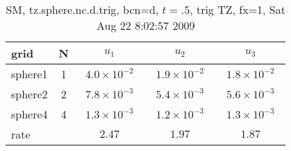 \begin{table}[hbt]\tableFont %
\begin{center}
\begin{tabular}{|l|c|c|c|c|} \hline 
grid  & N &  $u_1$ & $u_2$ & $u_3$  \\ \hline 
             sphere1 &     1 & ~$4.0\times10^{ -2}$~ & ~$1.9\times10^{ -2}$~ & ~$1.8\times10^{ -2}$~  \\ \hline
             sphere2 &     2 & ~$7.8\times10^{ -3}$~ & ~$5.4\times10^{ -3}$~ & ~$5.6\times10^{ -3}$~  \\ \hline
             sphere4 &     4 & ~$1.3\times10^{ -3}$~ & ~$1.2\times10^{ -3}$~ & ~$1.3\times10^{ -3}$~  \\ \hline
    rate             &       &       $2.47$          &       $1.97$          &       $1.87$           \\ \hline
\end{tabular}
\caption{SM, tz.sphere.nc.d.trig, bcn=d, $t=.5$, trig TZ, fx=1, Sat Aug 22  8:02:57 2009}\label{table:tz.sphere.nc.d.trig}
\end{center}
\end{table}
